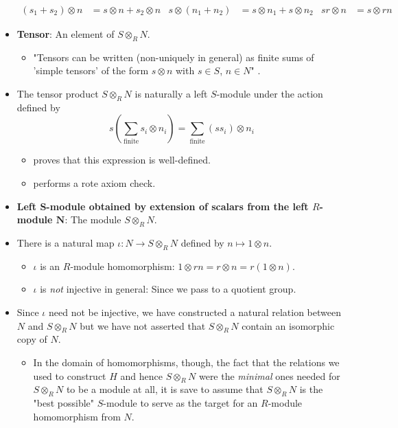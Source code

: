 \documentclass[../notes.tex]{subfiles}
\begin{document}
\begin{itemize}
\begin{align*}
        (s_1+s_2)\otimes n &= s\otimes n+s_2\otimes n&
        s\otimes(n_1+n_2) &= s\otimes n_1+s\otimes n_2&
        sr\otimes n &= s\otimes rn
    \end{align*}
    \item \textbf{Tensor}: An element of $S\otimes_RN$.
    \begin{itemize}
        \item "Tensors can be written (non-uniquely in general) as finite sums of 'simple tensors' of the form $s\otimes n$ with $s\in S$, $n\in N$" \parencite[360]{bib:DummitFoote}.
    \end{itemize}
    \item The tensor product $S\otimes_RN$ is naturally a left $S$-module under the action defined by
    \begin{equation*}
        s\left( \sum_\text{finite}s_i\otimes n_i \right) = \sum_\text{finite}(ss_i)\otimes n_i
    \end{equation*}
    \begin{itemize}
        \item \textcite{bib:DummitFoote} proves that this expression is well-defined.
        \item \textcite{bib:DummitFoote} performs a rote axiom check.
    \end{itemize}
    \item \textbf{Left $\bm{S}$-module obtained by extension of scalars from the left $R$-module $\bm{N}$}: The module $S\otimes_RN$.
    \item There is a natural map $\iota:N\to S\otimes_RN$ defined by $n\mapsto 1\otimes n$.
    \begin{itemize}
        \item $\iota$ is an $R$-module homomorphism: $1\otimes rn=r\otimes n=r(1\otimes n)$.
        \item $\iota$ is \emph{not} injective in general: Since we pass to a quotient group.
    \end{itemize}
    \item Since $\iota$ need not be injective, we have constructed a natural relation between $N$ and $S\otimes_RN$ but we have not asserted that $S\otimes_RN$ contain an isomorphic copy of $N$.
    \begin{itemize}
        \item In the domain of homomorphisms, though, the fact that the relations we used to construct $H$ and hence $S\otimes_RN$ were the \emph{minimal} ones needed for $S\otimes_RN$ to be a module at all, it is save to assume that $S\otimes_RN$ is the "best possible" $S$-module to serve as the target for an $R$-module homomorphism from $N$.

\end{itemize}
\end{itemize}
\end{document}
